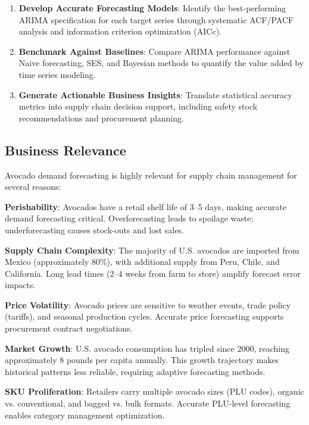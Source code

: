 \documentclass[12pt]{article}
\begin{document}
\begin{enumerate}
    \item \textbf{Develop Accurate Forecasting Models}: Identify the best-performing ARIMA specification for each target series through systematic ACF/PACF analysis and information criterion optimization (AICc).
    
    \item \textbf{Benchmark Against Baselines}: Compare ARIMA performance against Naive forecasting, SES, and Bayesian methods to quantify the value added by time series modeling.
    
    \item \textbf{Generate Actionable Business Insights}: Translate statistical accuracy metrics into supply chain decision support, including safety stock recommendations and procurement planning.
\end{enumerate}

\subsection{Business Relevance}

Avocado demand forecasting is highly relevant for supply chain management for several reasons:

\textbf{Perishability}: Avocados have a retail shelf life of 3--5 days, making accurate demand forecasting critical. Overforecasting leads to spoilage waste; underforecasting causes stock-outs and lost sales.

\textbf{Supply Chain Complexity}: The majority of U.S. avocados are imported from Mexico (approximately 80\%), with additional supply from Peru, Chile, and California. Long lead times (2--4 weeks from farm to store) amplify forecast error impacts.

\textbf{Price Volatility}: Avocado prices are sensitive to weather events, trade policy (tariffs), and seasonal production cycles. Accurate price forecasting supports procurement contract negotiations.

\textbf{Market Growth}: U.S. avocado consumption has tripled since 2000, reaching approximately 8 pounds per capita annually. This growth trajectory makes historical patterns less reliable, requiring adaptive forecasting methods.

\textbf{SKU Proliferation}: Retailers carry multiple avocado sizes (PLU codes), organic vs. conventional, and bagged vs. bulk formats. Accurate PLU-level forecasting enables category management optimization.
\end{document}
